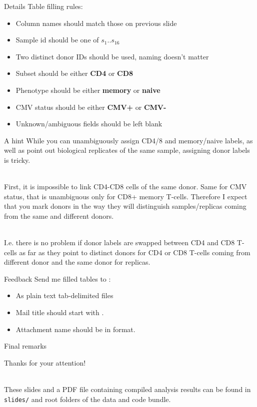 \documentclass[12pt]{beamer}
\begin{document}
\begin{frame}{Details}
Table filling rules:
\begin{itemize}
\item Column names should match those on previous slide
\item Sample id should be one of $s_1..s_{16}$
\item Two distinct donor IDs should be used, naming doesn't matter
\item Subset should be either \textbf{CD4} or \textbf{CD8}
\item Phenotype should be either \textbf{memory} or \textbf{naive}
\item CMV status should be either \textbf{CMV+} or \textbf{CMV-}
\item Unknown/ambiguous fields should be left blank
\end{itemize}
\end{frame}

\begin{frame}{A hint}
While you can unambiguously assign CD4/8 and memory/naive labels, as well as point out biological replicates of the same sample, assigning donor labels is tricky.\\~\

First, it is impossible to link CD4-CD8 cells of the same donor. Same for CMV status, that is unambiguous only for CD8+ memory T-cells. Therefore I expect that you mark donors in the way they will distinguish samples/replicas coming from the same and different donors.\\~\

I.e. there is no problem if donor labels are swapped between CD4 and CD8 T-cells as far as they point to distinct donors for CD4 or CD8 T-cells coming from different donor and the same donor for replicas.
\end{frame}

\begin{frame}{Feedback}
Send me filled tables to :
\begin{itemize}
\item As plain text tab-delimited files
\item Mail title should start with .
\item Attachment name should be in  format.
\end{itemize}
\end{frame}

\begin{frame}{Final remarks}
\begin{LARGE}
\begin{center}
Thanks for your attention!\\~\
\end{center}
\end{LARGE}


These slides and a PDF file containing compiled analysis results can be found in \texttt{slides/} and root folders of the data and code bundle.
\end{frame}
\end{document}
